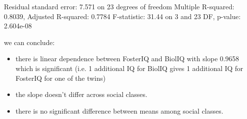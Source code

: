 \documentclass[a4paper]{article}
\begin{document}
\begin{itemize}
\begin{Schunk}
\begin{Soutput}
Residual standard error: 7.571 on 23 degrees of freedom
Multiple R-squared:  0.8039,	Adjusted R-squared:  0.7784 
F-statistic: 31.44 on 3 and 23 DF,  p-value: 2.604e-08
\end{Soutput}
\end{Schunk}
we can conclude:
\begin{itemize}
  \item there is linear dependence between FosterIQ and BiolIQ with slope 0.9658
  which is significant (i.e. 1 additional IQ for BiolIQ gives 1 additional IQ
  for FosterIQ for one of the twins)
  \item the slope doesn't differ across social classes.
  \item there is no significant difference between means among
  social classes.
\end{itemize}
  
\end{itemize}
\end{document}
